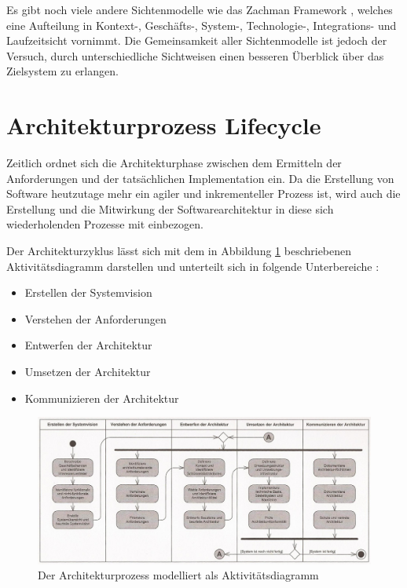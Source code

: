 Es gibt noch viele andere Sichtenmodelle wie das Zachman Framework \cite[S. 282]{zachman}, welches eine Aufteilung in Kontext-, Geschäfts-, System-, Technologie-, Integrations- und Laufzeitsicht vornimmt. Die Gemeinsamkeit aller Sichtenmodelle ist jedoch der Versuch, durch unterschiedliche Sichtweisen einen besseren Überblick über das Zielsystem zu erlangen.



\section{Architekturprozess Lifecycle}
Zeitlich ordnet sich die Architekturphase zwischen dem Ermitteln der Anforderungen und der tatsächlichen Implementation ein. Da die Erstellung von Software heutzutage mehr ein agiler und inkrementeller Prozess ist, wird auch die Erstellung und die Mitwirkung der Softwarearchitektur in diese sich wiederholenden Prozesse mit einbezogen. \cite[S. 7]{basiswissen}

Der Architekturzyklus lässt sich mit dem in Abbildung \ref{fig:cycle} beschriebenen Aktivitätsdiagramm darstellen und unterteilt sich in folgende Unterbereiche \cite[Umschlag]{softarch}:

\begin{itemize}
  \item \glqq Erstellen der Systemvision\grqq
  \item \glqq Verstehen der Anforderungen\grqq
  \item \glqq Entwerfen der Architektur\grqq
  \item \glqq Umsetzen der Architektur\grqq
  \item \glqq Kommunizieren der Architektur\grqq
\end{itemize}


\begin{figure}[H]
    \centering
    \includegraphics[scale=0.8]{img/archcycle.png}
    \caption{Der Architekturprozess modelliert als Aktivitätsdiagramm \cite[Umschlag]{softarch}}
    \label{fig:cycle}
\end{figure}

